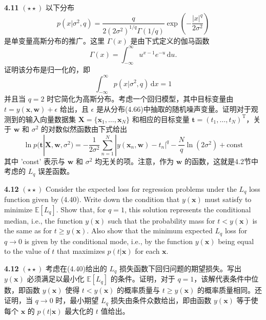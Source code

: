 \documentclass{article}
\begin{document}
\textbf{4.11} $(\star\star)$ 以下分布
\begin{equation}
p(x|\sigma^2, q) = \frac{q}{2(2\sigma^2)^{1/q}\Gamma(1/q)} \exp\left(-\frac{|x|^q}{2\sigma^2}\right) \tag{4.66}
\end{equation}
是单变量高斯分布的推广。这里 $\Gamma(x)$ 是由下式定义的伽马函数
\begin{equation}
\Gamma(x) = \int_{-\infty}^{\infty} u^{x-1} e^{-u} \,\mathrm{d}u. \tag{4.67}
\end{equation}
证明该分布是归一化的，即
\begin{equation}
\int_{-\infty}^{\infty} p(x|\sigma^2, q) \,\mathrm{d}x = 1 \tag{4.68}
\end{equation}
并且当 $q = 2$ 时它简化为高斯分布。考虑一个回归模型，其中目标变量由 $t = y(\mathbf{x}, \mathbf{w}) + \epsilon$ 给出，且 $\epsilon$ 是从分布(4.66)中抽取的随机噪声变量。证明对于观测到的输入向量数据集 $\mathbf{X} = \{\mathbf{x}_1, \dots, \mathbf{x}_N\}$ 和相应的目标变量 $\mathbf{t} = (t_1, \dots, t_N)^{\mathrm{T}}$，关于 $\mathbf{w}$ 和 $\sigma^2$ 的对数似然函数由下式给出
\begin{equation}
\ln p(\mathbf{t}|\mathbf{X}, \mathbf{w}, \sigma^2) = -\frac{1}{2\sigma^2} \sum_{n=1}^{N} |y(\mathbf{x}_n, \mathbf{w}) - t_n|^q - \frac{N}{q} \ln(2\sigma^2) + \text{const} \tag{4.69}
\end{equation}
其中 'const' 表示与 $\mathbf{w}$ 和 $\sigma^2$ 均无关的项。注意，作为 $\mathbf{w}$ 的函数，这就是4.2节中考虑的 $L_q$ 误差函数。


\textbf{4.12} $(\star\star)$ Consider the expected loss for regression problems under the $L_q$ loss function given by (4.40). Write down the condition that $y(\mathbf{x})$ must satisfy to minimize $\mathbb{E}[L_q]$. Show that, for $q = 1$, this solution represents the conditional median, i.e., the function $y(\mathbf{x})$ such that the probability mass for $t < y(\mathbf{x})$ is the same as for $t \ge y(\mathbf{x})$. Also show that the minimum expected $L_q$ loss for $q \to 0$ is given by the conditional mode, i.e., by the function $y(\mathbf{x})$ being equal to the value of $t$ that maximizes $p(t|\mathbf{x})$ for each $\mathbf{x}$.

\textbf{4.12} $(\star\star)$ 考虑在(4.40)给出的 $L_q$ 损失函数下回归问题的期望损失。写出 $y(\mathbf{x})$ 必须满足以最小化 $\mathbb{E}[L_q]$ 的条件。证明，对于 $q = 1$，该解代表条件中位数，即函数 $y(\mathbf{x})$ 使得 $t < y(\mathbf{x})$ 的概率质量与 $t \ge y(\mathbf{x})$ 的概率质量相同。还证明，当 $q \to 0$ 时，最小期望 $L_q$ 损失由条件众数给出，即由函数 $y(\mathbf{x})$ 等于使每个 $\mathbf{x}$ 的 $p(t|\mathbf{x})$ 最大化的 $t$ 值给出。
\end{document}
